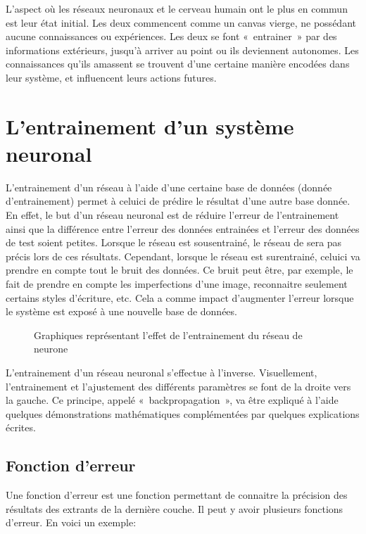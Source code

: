 \documentclass[letterpaper,10pt,french]{sphinxmanual}
\begin{document}
L’aspect où les réseaux neuronaux et le cerveau humain ont le plus en commun est leur état initial. Les deux commencent comme un canvas vierge, ne possédant
aucune connaissances ou expériences. Les deux se font « entrainer » par des informations extérieurs, jusqu’à arriver au point ou ils deviennent autonomes.
Les connaissances qu’ils amassent se trouvent d’une certaine manière encodées dans leur système, et influencent leurs actions futures.


\section{L’entrainement d’un système neuronal}
\label{\detokenize{training:l-entrainement-d-un-systeme-neuronal}}\label{\detokenize{training::doc}}
L’entrainement d’un réseau à l’aide d’une certaine base de données (donnée d’entrainement) permet à celui\sphinxhyphen{}ci de prédire le résultat
d’une autre base donnée. En effet, le but d’un réseau neuronal est de réduire l’erreur de l’entrainement ainsi que la différence
entre l’erreur des données entrainées et l’erreur des données de test soient petites. Lorsque le réseau est sous\sphinxhyphen{}entrainé,
le réseau de sera pas précis lors de ces résultats. Cependant, lorsque le réseau est sur\sphinxhyphen{}entrainé, celui\sphinxhyphen{}ci va prendre en compte
tout le bruit des données. Ce bruit peut être, par exemple, le fait de prendre en compte les imperfections d’une image, reconnaitre
seulement certains styles d’écriture, etc. Cela a comme impact d’augmenter l’erreur lorsque le système est exposé à une nouvelle base de données.

\begin{figure}[htbp]
\centering
\capstart

\noindent{}
\caption{Graphiques représentant l’effet de l’entrainement du réseau de neurone}\label{\detokenize{training:overfitting}}\end{figure}

L’entrainement d’un réseau neuronal s’effectue à l’inverse. Visuellement, l’entrainement et l’ajustement des différents
paramètres se font de la droite vers la gauche. Ce principe, appelé « backpropagation », va être expliqué à l’aide quelques
démonstrations mathématiques complémentées par quelques explications écrites.


\subsection{Fonction d’erreur}
\label{\detokenize{training:fonction-d-erreur}}
Une fonction d’erreur est une fonction permettant de connaitre la précision des résultats des extrants de la dernière
couche. Il peut y avoir plusieurs fonctions d’erreur. En voici un exemple:
\end{document}
